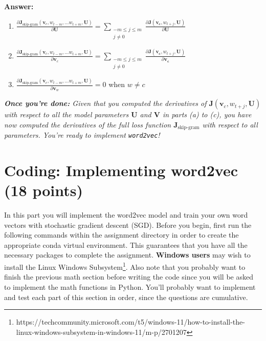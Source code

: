 \documentclass{article}
\newenvironment{answer}{
    {\bf Answer:} \sf \begingroup\color{red}
}{\endgroup}%
\begin{document}
\begin{enumerate}[label=(\alph*)]
\begin{shaded}
\begin{answer}
\begin{enumerate}[label=(\roman*)]
    \item ${\frac{\partial \bm J_{\textrm{skip-gram}}(\bm v_c, w_{t-m},\ldots w_{t+m}, \bm U)} {\partial \bm U}} = \sum_{\substack{-m \le j \le m \\ j \ne 0}} \frac{\partial \bm{J} (\bm{v_c},w_{t+j},\bm{U})}{\partial \bm{U}}$
    \item ${\frac{\partial \bm J_{\textrm{skip-gram}}(\bm v_c, w_{t-m},\ldots w_{t+m}, \bm U)} {\partial \bm v_c}} = \sum_{\substack{-m \le j \le m \\ j \ne 0}} \frac{\partial \bm{J} (\bm{v_c},w_{t+j},\bm{U})}{\partial \bm{v_c}}$
    \item ${\frac{\partial \bm J_{\textrm{skip-gram}}(\bm v_c, w_{t-m},\ldots w_{t+m}, \bm U)} {\partial \bm v_w}} = 0$ when $w \ne c$
\end{enumerate}
\end{answer}
\end{shaded}

\textit{\textbf{Once you're done:} Given that you computed the derivatives of $\bm J(\bm v_c, w_{t+j}, \bm U)$ with respect to all the model parameters $\bm U$ and $\bm V$ in parts (a) to (c), you have now computed the derivatives of the full loss function $\bm J_{\text{skip-gram}}$ with respect to all parameters. You're ready to implement \texttt{word2vec}!} %

\end{enumerate}

\section{Coding: Implementing word2vec (18 points)}
In this part you will implement the word2vec model and train your own word vectors with stochastic gradient descent (SGD). Before you begin, first run the following commands within the assignment directory in order to create the appropriate conda virtual environment. This guarantees that you have all the necessary packages to complete the assignment. \textbf{Windows users} may wish to install the Linux Windows Subsystem\footnote{https://techcommunity.microsoft.com/t5/windows-11/how-to-install-the-linux-windows-subsystem-in-windows-11/m-p/2701207}. Also note that you probably want to finish the previous math section before writing the code since you will be asked to implement the math functions in Python. You’ll probably want to implement and test each part of this section in order, since the questions are cumulative.
\end{document}
